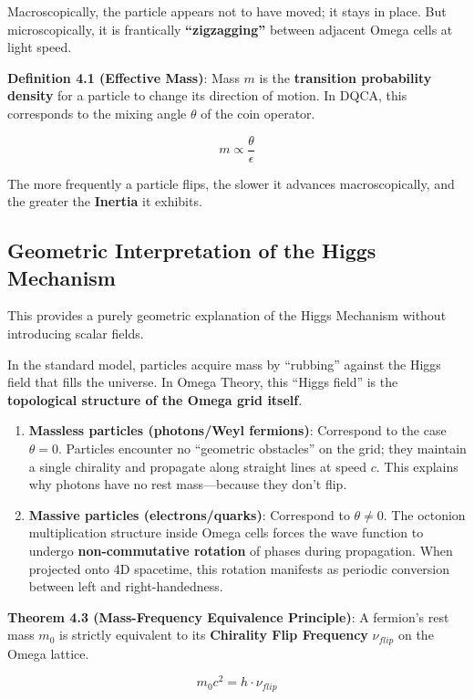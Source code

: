 Macroscopically, the particle appears not to have moved; it stays in place. But microscopically, it is frantically \textbf{``zigzagging''} between adjacent Omega cells at light speed.

\textbf{Definition 4.1 (Effective Mass)}:
Mass $m$ is the \textbf{transition probability density} for a particle to change its direction of motion. In DQCA, this corresponds to the mixing angle $\theta$ of the coin operator.

\[m \propto \frac{\theta}{\epsilon}\]

The more frequently a particle flips, the slower it advances macroscopically, and the greater the \textbf{Inertia} it exhibits.

\subsection{Geometric Interpretation of the Higgs Mechanism}

This provides a purely geometric explanation of the Higgs Mechanism without introducing scalar fields.

In the standard model, particles acquire mass by ``rubbing'' against the Higgs field that fills the universe. In Omega Theory, this ``Higgs field'' is the \textbf{topological structure of the Omega grid itself}.

\begin{enumerate}
\item \textbf{Massless particles (photons/Weyl fermions)}: Correspond to the case $\theta = 0$. Particles encounter no ``geometric obstacles'' on the grid; they maintain a single chirality and propagate along straight lines at speed $c$. This explains why photons have no rest mass---because they don't flip.
\item \textbf{Massive particles (electrons/quarks)}: Correspond to $\theta \neq 0$. The octonion multiplication structure inside Omega cells forces the wave function to undergo \textbf{non-commutative rotation} of phases during propagation. When projected onto 4D spacetime, this rotation manifests as periodic conversion between left and right-handedness.
\end{enumerate}

\textbf{Theorem 4.3 (Mass-Frequency Equivalence Principle)}:
A fermion's rest mass $m_0$ is strictly equivalent to its \textbf{Chirality Flip Frequency} $\nu_{flip}$ on the Omega lattice.

\[m_0 c^2 = h \cdot \nu_{flip}\]

